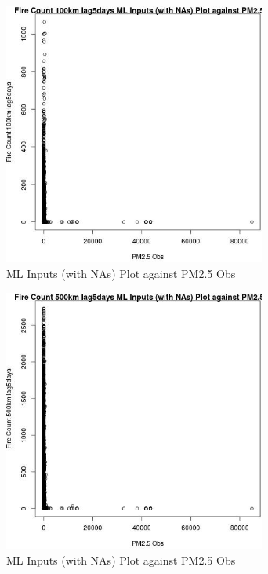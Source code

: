 \begin{figure} 
\centering  
\includegraphics[width=0.77\textwidth]{Code_Outputs/Report_ML_input_PM25_Step4_part_f_de_duplicated_aves_prioritize_24hr_obswNAs_Fire_Count_100km_lag5daysvPM25_Obs.jpg} 
\caption{\label{fig:Report_ML_input_PM25_Step4_part_f_de_duplicated_aves_prioritize_24hr_obswNAsFire_Count_100km_lag5daysvPM25_Obs}ML Inputs (with NAs) Plot against PM2.5 Obs} 
\end{figure} 
 

\begin{figure} 
\centering  
\includegraphics[width=0.77\textwidth]{Code_Outputs/Report_ML_input_PM25_Step4_part_f_de_duplicated_aves_prioritize_24hr_obswNAs_Fire_Count_500km_lag5daysvPM25_Obs.jpg} 
\caption{\label{fig:Report_ML_input_PM25_Step4_part_f_de_duplicated_aves_prioritize_24hr_obswNAsFire_Count_500km_lag5daysvPM25_Obs}ML Inputs (with NAs) Plot against PM2.5 Obs} 
\end{figure} 
 

